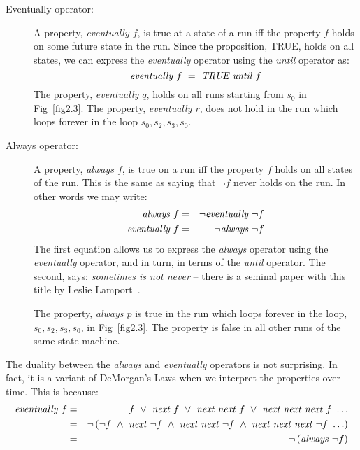 \begin{description}

\item[Eventually operator: ] 
	A property, {\em eventually $f$}, is true at a state
	of a run iff the property $f$ holds on some future
	state in the run. Since the proposition, TRUE, holds on all states,
	we can express the {\em eventually} operator using the {\em until}
	operator as:
	\[ \mbox{\em eventually } f\ =\ \mbox{\em TRUE until } f \]
	The property, {\em eventually $q$}, holds on all runs starting from
	$s_0$ in Fig~\ref{fig2.3}. The property, {\em eventually $r$}, does
	not hold in the run which loops forever in the loop
	$s_0, s_2, s_3, s_0$.

\item[Always operator: ] 
	A property, {\em always $f$}, is true on a run iff
	the property $f$ holds on all states of the run. This is the same
	as saying that $\neg f$ never holds on the run. In other words we
	may write:
	\begin{eqnarray*}
	\mbox{\em always } f & = & \neg \mbox{\em eventually } \neg f \\
	\mbox{\em eventually } f & = & \neg \mbox{\em always } \neg f
	\end{eqnarray*}
	The first equation allows us to express the {\em always} operator
	using the {\em eventually} operator, and in turn, in terms of the
	{\em until} operator. The second, says: {\em sometimes is not never}
	-- there is a seminal paper with this title by Leslie 
	Lamport~\cite{r15}.

	The property, {\em always $p$} is true in the run which loops forever
	in the loop, $s_0, s_2, s_3, s_0$, in Fig~\ref{fig2.3}. The property
	is false in all other runs of the same state machine.

\end{description}
The duality between the {\em always} and {\em eventually} operators is not
surprising.  
In fact, it is a variant of DeMorgan's Laws when we interpret
the properties over time. This is because:
\begin{eqnarray*}
\mbox{\em eventually } f & = & f\ \lor\ \mbox{\em next } f\ \lor\ 
				\mbox{\em next next } f\ \lor\ 
				\mbox{\em next next next } f\ \ldots\\
& = & \neg \left( \neg f\ \land\ \mbox{\em next } \neg f\ \land\ 
		\mbox{\em next next } \neg f\ \land\
		\mbox{\em next next next } \neg f\ \ldots \right) \\
& = & \neg \left( \mbox{\em always } \neg f \right)
\end{eqnarray*}

